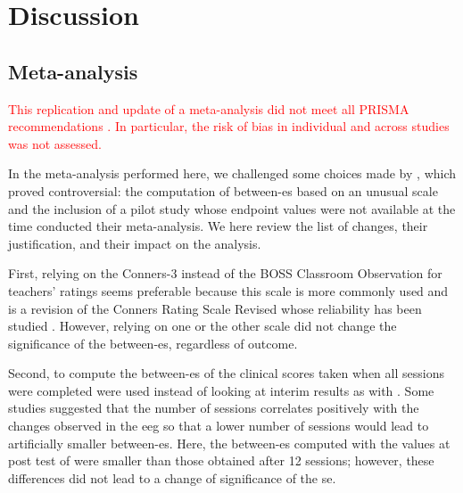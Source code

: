


\section{Discussion}

\subsection{Meta-analysis} 

\textcolor{red}{This replication and update of a meta-analysis did not meet all PRISMA recommendations \citep{Moher2009}. In particular, the risk of bias
in individual and across studies was not assessed.}  

In the meta-analysis performed here, we challenged some choices made by \citeauthor{Cortese2016}, which proved controversial: 
the computation of between-\gls{es} based on an unusual scale \citep{Steiner2014} and the inclusion of a pilot study \citep{Arnold2014} 
whose endpoint values were not available at the time \citeauthor{Cortese2016} conducted their meta-analysis. We here review the 
list of changes, their justification, and their impact on the analysis.
 
First, relying on the Conners-3 \citep{Conners2011} instead of the BOSS Classroom Observation \citep{Shapiro2010} for
teachers' ratings seems preferable because this scale is more commonly used \citep{Christiansen2014, Bluschke2016} and is
a revision of the Conners Rating Scale Revised \citep{Conners1998} whose reliability has been studied \citep{Collett2003}. 
However, relying on one or the other scale did not change the significance of the between-\gls{es}, regardless of outcome.

Second, to compute the between-\gls{es} of \citet{Arnold2014} the clinical scores taken when all sessions were completed were 
used instead of looking at interim results as with \citeauthor{Cortese2016}. Some studies suggested that the number of sessions 
correlates positively with the changes observed in the \gls{eeg} \citep{Vernon2004} so that a lower number of sessions would 
lead to artificially smaller between-\gls{es}. Here, the between-\gls{es} computed with the values at post test of \citet{Arnold2014} were smaller 
than those obtained after 12 sessions; however, these differences did not lead to a change of significance of the \gls{se}. 

